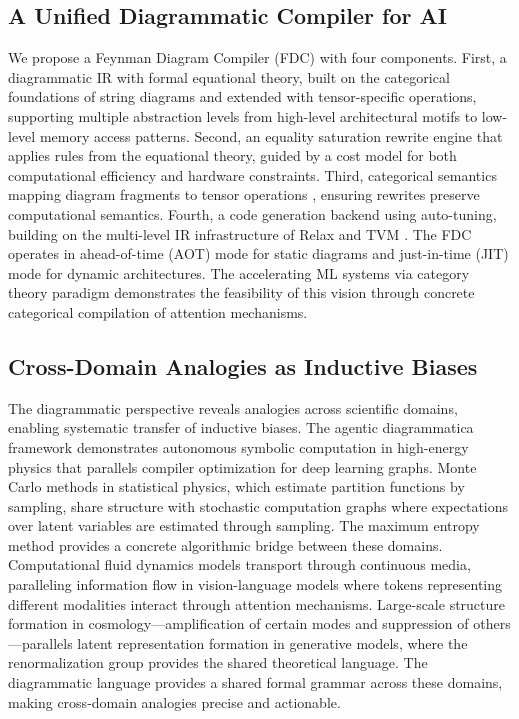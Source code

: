 \documentclass[12pt,a4paper]{article}
\begin{document}
\subsection{A Unified Diagrammatic Compiler for AI}

We propose a Feynman Diagram Compiler (FDC) with four components. First, a diagrammatic IR with formal equational theory, built on the categorical foundations of string diagrams \cite{toumi2022discopy} and extended with tensor-specific operations, supporting multiple abstraction levels from high-level architectural motifs to low-level memory access patterns. Second, an equality saturation rewrite engine that applies rules from the equational theory, guided by a cost model for both computational efficiency and hardware constraints. Third, categorical semantics mapping diagram fragments to tensor operations \cite{crescenzi2024towards, cruttwell2022categorical}, ensuring rewrites preserve computational semantics. Fourth, a code generation backend using auto-tuning, building on the multi-level IR infrastructure of Relax \cite{lai2023relax} and TVM \cite{chen2018tvma}. The FDC operates in ahead-of-time (AOT) mode for static diagrams and just-in-time (JIT) mode for dynamic architectures. The accelerating ML systems via category theory paradigm \cite{abbott2025accelerating} demonstrates the feasibility of this vision through concrete categorical compilation of attention mechanisms.

\subsection{Cross-Domain Analogies as Inductive Biases}

The diagrammatic perspective reveals analogies across scientific domains, enabling systematic transfer of inductive biases. The agentic diagrammatica framework \cite{agentic2026agentic} demonstrates autonomous symbolic computation in high-energy physics that parallels compiler optimization for deep learning graphs. Monte Carlo methods in statistical physics, which estimate partition functions by sampling, share structure with stochastic computation graphs where expectations over latent variables are estimated through sampling. The maximum entropy method \cite{granziol2019meme} provides a concrete algorithmic bridge between these domains. Computational fluid dynamics models transport through continuous media, paralleling information flow in vision-language models where tokens representing different modalities interact through attention mechanisms. Large-scale structure formation in cosmology---amplification of certain modes and suppression of others---parallels latent representation formation in generative models, where the renormalization group \cite{banta2024structures} provides the shared theoretical language. The diagrammatic language provides a shared formal grammar across these domains, making cross-domain analogies precise and actionable.
\end{document}

